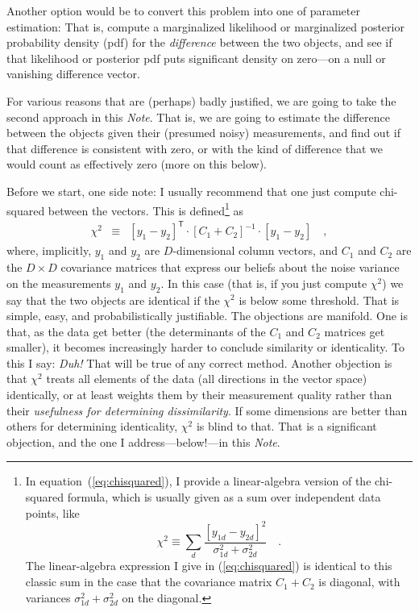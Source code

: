 \documentclass[12pt,letterpaper]{article}
\newcommand{\documentname}{\textsl{Note}}
\newcommand{\equationname}{equation}
\newcommand{\tra}[1]{{#1}^{\mathsf{T}}}
\newcommand{\inv}[1]{{#1}^{-1}}
\begin{document}
Another option would be to convert this problem into one of parameter
estimation: That is, compute a marginalized likelihood or marginalized
posterior probability density (pdf) for the \emph{difference} between
the two objects, and see if that likelihood or posterior pdf puts
significant density on zero---on a null or vanishing difference
vector.

For various reasons that are (perhaps) badly justified, we are going
to take the second approach in this \documentname. That is, we are
going to estimate the difference between the objects given their
(presumed noisy) measurements, and find out if that difference is
consistent with zero, or with the kind of difference that we would count
as effectively zero (more on this below).

Before we start, one side note: I usually recommend that one just
compute chi-squared between the vectors. This is defined\footnote{In
  \equationname~(\ref{eq:chisquared}), I provide a linear-algebra
  version of the chi-squared formula, which is usually given as a sum
  over independent data points, like
  \[\chi^2\equiv\sum_d\frac{[y_{1d}-y_{2d}]^2}{\sigma_{1d}^2+\sigma_{2d}^2} \quad .\]
  The linear-algebra expression I give in (\ref{eq:chisquared}) is
  identical to this classic sum in the case that the covariance matrix
  $C_1 + C_2$ is diagonal, with variances $\sigma_{1d}^2+\sigma_{2d}^2$ on the
  diagonal.} as
\begin{eqnarray}
\chi^2 &\equiv&
\tra{[y_1 - y_2]}\cdot\inv{[C_1 + C_2]}\cdot [y_1 - y_2] \quad ,
\label{eq:chisquared}
\end{eqnarray}
where, implicitly, $y_1$ and $y_2$ are $D$-dimensional column vectors,
and $C_1$ and $C_2$ are the $D\times D$ covariance matrices that
express our beliefs about the noise variance on the measurements $y_1$
and $y_2$. In this case (that is, if you just compute $\chi^2$) we say
that the two objects are identical if the $\chi^2$ is below some
threshold. That is simple, easy, and probabilistically
justifiable. The objections are manifold. One is that, as the data get
better (the determinants of the $C_1$ and $C_2$ matrices get smaller),
it becomes increasingly harder to conclude similarity or
identicality. To this I say: \emph{Duh!} That will be true of any
correct method. Another objection is that $\chi^2$ treats all elements
of the data (all directions in the vector space) identically, or at
least weights them by their measurement quality rather than their
\emph{usefulness for determining dissimilarity}. If some dimensions
are better than others for determining identicality, $\chi^2$ is blind
to that. That is a significant objection, and the one I
address---below!---in this \documentname.
\end{document}

